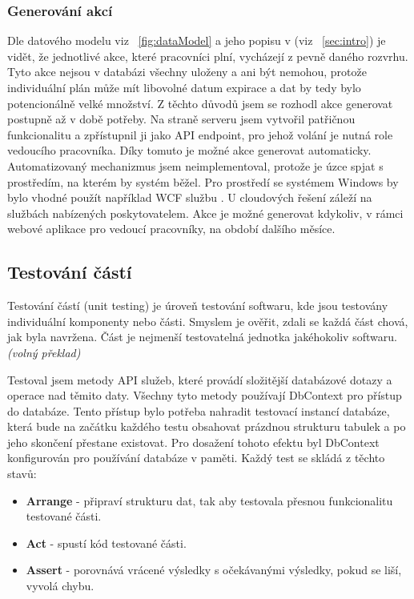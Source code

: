 \documentclass[
  glossaries,
]{kidiplom}
\begin{document}
\subsubsection{Generování akcí}
\label{sec:actionGenerating}
Dle datového modelu viz ~\ref{fig:dataModel} a jeho popisu v (viz ~\ref{sec:intro}) je vidět, že jednotlivé akce, které pracovníci plní, vycházejí z pevně daného rozvrhu. Tyto akce nejsou v databázi všechny uloženy a ani být nemohou, protože individuální plán může mít libovolné datum expirace a dat by tedy bylo potencionálně velké množství. Z těchto důvodů jsem se rozhodl akce generovat postupně až v době potřeby. Na straně serveru jsem vytvořil patřičnou funkcionalitu a zpřístupnil ji jako API endpoint, pro jehož volání je nutná role vedoucího pracovníka. Díky tomuto je možné akce generovat automaticky. Automatizovaný mechanizmus jsem neimplementoval, protože je úzce spjat s prostředím, na kterém by systém běžel. Pro prostředí se systémem Windows by bylo vhodné použít například WCF službu \cite{13}. U cloudových řešení záleží na službách nabízených poskytovatelem. Akce je možné generovat kdykoliv, v rámci webové aplikace pro vedoucí pracovníky, na období dalšího měsíce.

\subsection{Testování částí}
Testování částí (unit testing) je úroveň testování softwaru, kde jsou testovány individuální komponenty nebo části. Smyslem je ověřit, zdali se každá část chová, jak byla navržena. Část je nejmenší testovatelná jednotka jakéhokoliv softwaru. \cite{14} \textit{(volný překlad)}

Testoval jsem metody API služeb, které provádí složitější databázové dotazy a operace nad těmito daty. Všechny tyto metody používají DbContext pro přístup do databáze. Tento přístup bylo potřeba nahradit testovací instancí databáze, která bude na začátku každého testu obsahovat prázdnou strukturu tabulek a po jeho skončení přestane existovat. Pro dosažení tohoto efektu byl DbContext konfigurován pro používání databáze v paměti. Každý test se skládá z těchto stavů: 
\begin{itemize}
	\item \textbf{Arrange} - připraví strukturu dat, tak aby testovala přesnou funkcionalitu testované části.
	\item \textbf{Act} - spustí kód testované části.
	\item \textbf{Assert} - porovnává vrácené výsledky s očekávanými výsledky, pokud se liší, vyvolá chybu.
\end{itemize}
\end{document}
